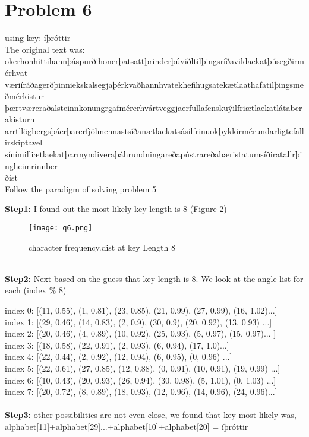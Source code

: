 \documentclass[12pt,letterpaper]{article}
\begin{document}
\section*{Problem 6}
  using key: íþróttir \\
  The original text was:\\
  okerhonhittihannþáspurðihonerþatsattþrinderþúviðltilþingsríðavildaekatþúsegðirmérhvat\\væriíráðagerðþinniekskalsegjaþérkvaðhannhvatekhefihugsatekætlaathafatilþingsmeðmérkistur\\þærtværeraðalsteinnkonungrgafmérerhvártveggjaerfullafenskuýilfriætlaekatlátaberakisturn\\arrtllögbergsþáerþarerfjölmennastsíðanætlaekatsásilfrinuokþykkirmérundarligtefallirskiptavel\\sínímilliætlaekatþarmyndiveraþáhrundningareðapústrareðabæristatumsíðiratallrþingheimrinnber\\ðist\\

  Follow the paradigm of solving problem 5
  
  \textbf{Step1:} I found out the most likely key length is 8 (Figure 2)
  \begin{figure}[!h]
    \centering
    \texttt{[image: q6.png]}
    \caption{character frequency.dist at key Length 8}
  \end{figure}
  \\
  \textbf{Step2:} Next based on the guess that key length is 8. We look at the angle list for each (index \% 8)
  
  index 0: [(11, 0.55), (1, 0.81), (23, 0.85), (21, 0.99), (27, 0.99), (16, 1.02)...] \\
  index 1: [(29, 0.46), (14, 0.83), (2, 0.9), (30, 0.9), (20, 0.92), (13, 0.93)  ...] \\
  index 2: [(20, 0.46), (4, 0.89), (10, 0.92), (25, 0.93), (5, 0.97), (15, 0.97)... ] \\
  index 3: [(18, 0.58), (22, 0.91), (2, 0.93), (6, 0.94), (17, 1.0)...] \\
  index 4: [(22, 0.44), (2, 0.92), (12, 0.94), (6, 0.95), (0, 0.96) ...] \\
  index 5: [(22, 0.61), (27, 0.85), (12, 0.88), (0, 0.91), (10, 0.91), (19, 0.99) ...] \\
  index 6: [(10, 0.43), (20, 0.93), (26, 0.94), (30, 0.98), (5, 1.01), (0, 1.03) ...] \\
  index 7: [(20, 0.72), (8, 0.89), (18, 0.93), (12, 0.96), (14, 0.96), (24, 0.96)...] \\ \\
  \textbf{Step3:} other possibilities are not even close, we found that key most likely was, \\ alphabet[11]+alphabet[29]...+alphabet[10]+alphabet[20] =  
  íþróttir
  
\end{document}
